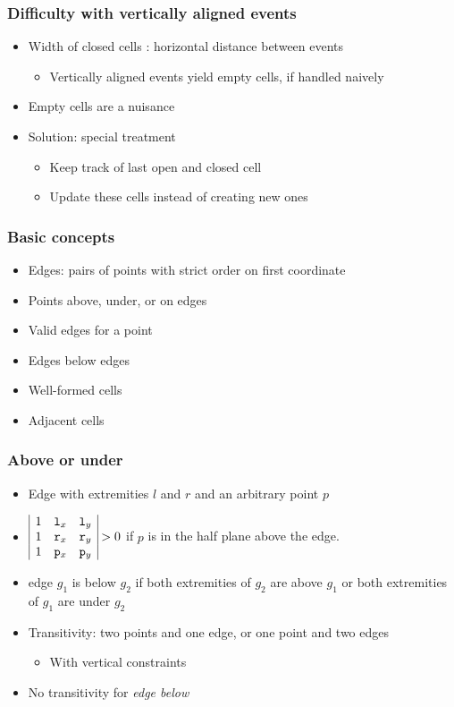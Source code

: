 \documentclass[compress]{beamer}
\begin{document}
\begin{frame}
\frametitle{Difficulty with vertically aligned events}
\begin{itemize}
\item  Width of closed cells : horizontal distance between events
\begin{itemize}
\item Vertically aligned events yield empty cells, if handled naively
\end{itemize}
\item Empty cells are a nuisance
\item Solution: special treatment
\begin{itemize}
\item Keep track of last open and closed cell
\item Update these cells instead of creating new ones
\end{itemize}
\end{itemize}
\end{frame}
\begin{frame}
\frametitle{Basic concepts}
\begin{itemize}
\item Edges: pairs of points with strict order on first coordinate
\item Points above, under, or on edges
\item Valid edges for a point
\item Edges below edges
\item Well-formed cells
\item Adjacent cells
\end{itemize}
\end{frame}
\begin{frame}
\frametitle{Above or under}
\begin{itemize}
\item Edge with extremities \(l\) and \(r\) and an arbitrary point \(p\)
\item \(\begin{array}{|ccc|}
1 & {\tt l}_x & {\tt l}_y\\
1 & {\tt r}_x & {\tt r}_y\\
1 & {\tt p}_x & {\tt p}_y\\
\end{array} > 0 \)
\quad if \(p\) is in the half plane above the edge.
\item edge \(g_1\) is below \(g_2\) if both extremities of \(g_2\) are above
\(g_1\) or both extremities of \(g_1\) are under \(g_2\)
\item Transitivity: two points and one edge, or one point and two edges
\begin{itemize}
\item With vertical constraints
\end{itemize}
\item No transitivity for {\em edge below}
\end{itemize}
\end{frame}
\end{document}
